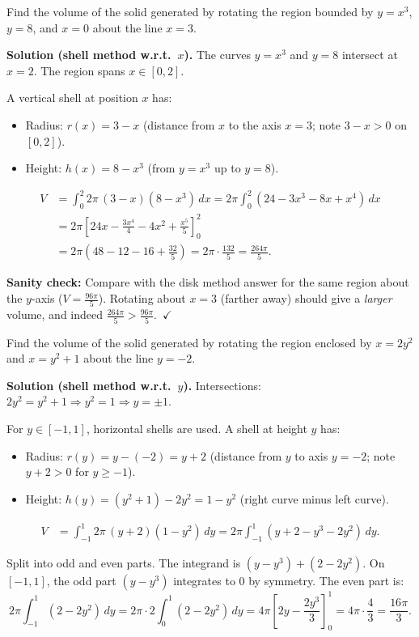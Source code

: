 \begin{examplebox}[title={Worked Example (Tutorial 4, Q1(b)): Shells about a shifted vertical axis $x=3$}]
Find the volume of the solid generated by rotating the region bounded by $y=x^3$, $y=8$, and $x=0$ about the line $x=3$.

\textbf{Solution (shell method w.r.t.\ $x$).}
The curves $y=x^3$ and $y=8$ intersect at $x=2$. The region spans $x\in[0,2]$.

A vertical shell at position $x$ has:
\begin{itemize}[leftmargin=2em]
\item Radius: $r(x)=3-x$ \quad (distance from $x$ to the axis $x=3$; note $3-x>0$ on $[0,2]$).
\item Height: $h(x)=8-x^3$ \quad (from $y=x^3$ up to $y=8$).
\end{itemize}

\begin{align*}
V&=\int_0^2 2\pi\,(3-x)(8-x^3)\,dx
=2\pi\int_0^2 (24-3x^3-8x+x^4)\,dx\\
&=2\pi\left[24x-\frac{3x^4}{4}-4x^2+\frac{x^5}{5}\right]_0^2\\
&=2\pi\left(48-12-16+\frac{32}{5}\right)
=2\pi\cdot\frac{132}{5}
=\frac{264\pi}{5}.
\end{align*}

\textbf{Sanity check:} Compare with the disk method answer for the same region about the $y$-axis ($V=\frac{96\pi}{5}$). Rotating about $x=3$ (farther away) should give a \emph{larger} volume, and indeed $\frac{264\pi}{5}>\frac{96\pi}{5}$.\ $\checkmark$
\end{examplebox}

\begin{examplebox}[title={Worked Example (Tutorial 4, Q1(c)): Shells about a shifted horizontal axis $y=-2$}]
Find the volume of the solid generated by rotating the region enclosed by $x=2y^2$ and $x=y^2+1$ about the line $y=-2$.

\textbf{Solution (shell method w.r.t.\ $y$).}
Intersections: $2y^2=y^2+1\Rightarrow y^2=1\Rightarrow y=\pm 1$.

For $y\in[-1,1]$, horizontal shells are used. A shell at height $y$ has:
\begin{itemize}[leftmargin=2em]
\item Radius: $r(y)=y-(-2)=y+2$ \quad (distance from $y$ to axis $y=-2$; note $y+2>0$ for $y\ge -1$).
\item Height: $h(y)=(y^2+1)-2y^2=1-y^2$ \quad (right curve minus left curve).
\end{itemize}

\begin{align*}
V&=\int_{-1}^{1}2\pi\,(y+2)(1-y^2)\,dy
=2\pi\int_{-1}^{1}(y+2-y^3-2y^2)\,dy.
\end{align*}

Split into odd and even parts. The integrand is $(y-y^3)+(2-2y^2)$. On $[-1,1]$, the odd part $(y-y^3)$ integrates to $0$ by symmetry. The even part is:
\[
2\pi\int_{-1}^{1}(2-2y^2)\,dy = 2\pi\cdot 2\int_0^1(2-2y^2)\,dy
=4\pi\left[2y-\frac{2y^3}{3}\right]_0^1
=4\pi\cdot\frac{4}{3}=\frac{16\pi}{3}.
\]
\end{examplebox}

